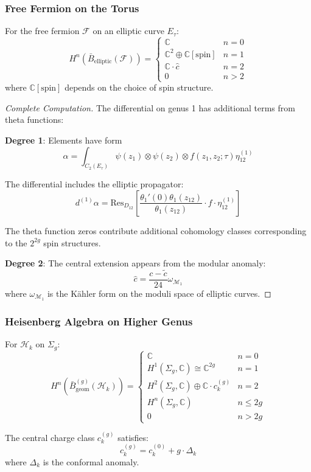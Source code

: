 \subsubsection{Free Fermion on the Torus}

\begin{theorem}
For the free fermion $\mathcal{F}$ on an elliptic curve $E_\tau$:
\[
H^n(\bar{B}_{\text{elliptic}}(\mathcal{F})) = \begin{cases}
\mathbb{C} & n = 0 \\
\mathbb{C}^2 \oplus \mathbb{C}[\text{spin}] & n = 1 \\
\mathbb{C} \cdot \hat{c} & n = 2 \\
0 & n > 2
\end{cases}
\]
where $\mathbb{C}[\text{spin}]$ depends on the choice of spin structure.
\end{theorem}

\begin{proof}[Complete Computation]
The differential on genus 1 has additional terms from theta functions:

\textbf{Degree 1}: Elements have form
\[
\alpha = \int_{C_2(E_\tau)} \psi(z_1) \otimes \psi(z_2) \otimes f(z_1, z_2; \tau)\eta_{12}^{(1)}
\]

The differential includes the elliptic propagator:
\[
d^{(1)}\alpha = \text{Res}_{D_{12}}\left[\frac{\theta_1'(0)\theta_1(z_{12})}{\theta_1(z_{12})} \cdot f \cdot \eta_{12}^{(1)}\right]
\]

The theta function zeros contribute additional cohomology classes corresponding to the $2^{2g}$ spin structures.

\textbf{Degree 2}: The central extension appears from the modular anomaly:
\[
\hat{c} = \frac{c - \tilde{c}}{24}\omega_{\mathcal{M}_1}
\]
where $\omega_{\mathcal{M}_1}$ is the Kähler form on the moduli space of elliptic curves.
\end{proof}

\subsubsection{Heisenberg Algebra on Higher Genus}

\begin{theorem}
For $\mathcal{H}_k$ on $\Sigma_g$:
\[
H^n(\bar{B}_{\text{geom}}^{(g)}(\mathcal{H}_k)) = \begin{cases}
\mathbb{C} & n = 0 \\
H^1(\Sigma_g, \mathbb{C}) \cong \mathbb{C}^{2g} & n = 1 \\
H^2(\Sigma_g, \mathbb{C}) \oplus \mathbb{C} \cdot c_k^{(g)} & n = 2 \\
H^n(\Sigma_g, \mathbb{C}) & n \leq 2g \\
0 & n > 2g
\end{cases}
\]

The central charge class $c_k^{(g)}$ satisfies:
\[
c_k^{(g)} = c_k^{(0)} + g \cdot \Delta_k
\]
where $\Delta_k$ is the conformal anomaly.
\end{theorem}

